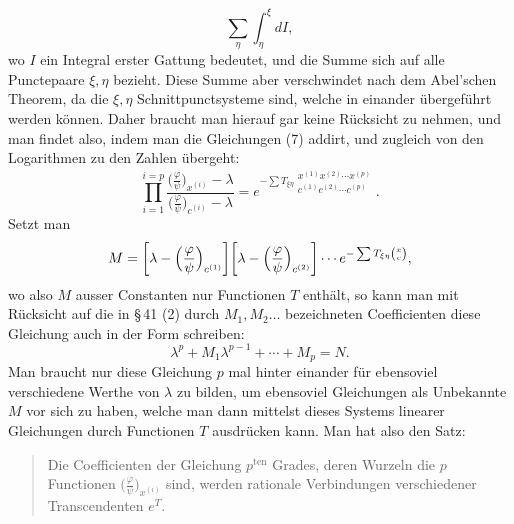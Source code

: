 \documentclass[10pt]{article}
\begin{document}
\[
\sum_\eta\int_\eta^\xi dI,
\]
wo \(I\) ein Integral erster Gattung bedeutet, und die Summe sich auf alle Punctepaare \(\xi,\eta\) bezieht. Diese Summe aber verschwindet nach dem Abel'schen Theorem, da die \(\xi,\eta\) Schnittpunctsysteme sind, welche in einander übergeführt werden können. Daher braucht man hierauf gar keine Rücksicht zu nehmen, und man findet also, indem man die Gleichungen (7) addirt, und zugleich von den Logarithmen zu den Zahlen übergeht:
\[
\prod_{i=1}^{i=p}
\frac{\bigl(\frac{\varphi}{\psi}\bigr)_{x^{(i)}}-\lambda}
{\bigl(\frac{\varphi}{\psi}\bigr)_{c^{(i)}}-\lambda}
=e^{-\sum T_{\xi\eta}\begin{smallmatrix}x^{(1)}x^{(2)}\cdots x^{(p)}\\c^{(1)}c^{(2)}\cdots c^{(p)}\end{smallmatrix}}.
\]
Setzt man
\[
M=\biggl[\lambda-\Bigl(\frac{\varphi}{\psi}\Bigr)_{c^{(1)}}\biggr]
\biggl[\lambda-\Bigl(\frac{\varphi}{\psi}\Bigr)_{c^{(2)}}\biggr]
\cdots e^{-\sum T_{\xi\eta}\binom{x}{c}},
\]
wo also \(M\) ausser Constanten nur Functionen \(T\) enthält, so kann man mit Rücksicht auf die in \S\,41 (2) durch \(M_1,M_2\ldots\) bezeichneten Coefficienten diese Gleichung auch in der Form schreiben:
\[
\lambda^p+M_1\lambda^{p-1}+\cdots+M_p=N.
\]
Man braucht nur diese Gleichung \(p\) mal hinter einander für ebensoviel verschiedene Werthe von \(\lambda\) zu bilden, um ebensoviel Gleichungen als Unbekannte \(M\) vor sich zu haben, welche man dann mittelst dieses Systems linearer Gleichungen durch Functionen \(T\) ausdrücken kann. Man hat also den Satz:

\begin{quote}
Die Coefficienten der Gleichung \(p^{\mathrm{ten}}\) Grades, deren Wurzeln die \(p\) Functionen \(\bigl(\frac{\varphi}{\psi}\bigr)_{x^{(i)}}\) sind, werden rationale Verbindungen verschiedener Transcendenten \(e^T\).
\end{quote}
\end{document}
